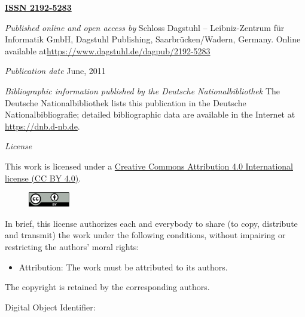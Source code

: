 \documentclass[a4paper,USenglish]{dagrep-master-v2021}
\begin{document}
\begin{publicationinfo}%
\sffamily
\twocolumn



{\Large\bf\sffamily \textbf{\href{http://www.dagstuhl.de/dagrep}{ISSN 2192-5283}}}

\bigskip
\bigskip

\emph{Published online and open access by}\newline 
Schloss Dagstuhl -- Leibniz-Zentrum f\"ur Informatik GmbH, Dagstuhl
Publishing, Saarbr\"ucken/Wadern, Germany.  Online available at\newline \href{https://www.dagstuhl.de/dagpub/2192-5283}{https://www.dagstuhl.de/dagpub/2192-5283}

\bigskip
\emph{Publication date}\newline
June, 2011

\bigskip
\emph{Bibliographic information published by the Deutsche
  Nationalbibliothek}\newline 
The Deutsche Nationalbibliothek lists this publication in the Deutsche
Nationalbibliografie; detailed bibliographic data are available in the
Internet at \url{https://dnb.d-nb.de}.

\bigskip
\emph{License}

This work is licensed under a \href{https://creativecommons.org/licenses/by/4.0/de/legalcode}{Creative Commons
Attribution 4.0 International license (CC BY 4.0)}.

\begin{figure}
\vspace*{-1\baselineskip}
\includegraphics[width=1.8cm]{cc-by}
\end{figure} 
In brief, this license authorizes each and everybody to share (to
copy, distribute and transmit) the work under the following
conditions, without impairing or restricting the authors'
moral rights:
\begin{itemize}
\item Attribution: The work must be attributed to its authors.
\end{itemize}

\smallskip

The copyright is retained by the corresponding authors.

\vfill

Digital Object Identifier: \printDOI


\end{publicationinfo}
\end{document}
